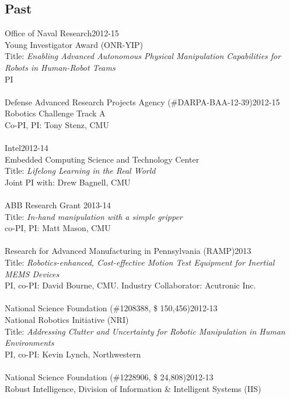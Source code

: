 \subsection{Past}
\noindent
Office of Naval Research\hfill 2012-15\\
Young Investigator Award (ONR-YIP)\\
Title: \textit{Enabling Advanced Autonomous Physical Manipulation Capabilities for Robots in Human-Robot Teams}\\
PI\\
\\
Defense Advanced Research Projects Agency (\#DARPA-BAA-12-39)\hfill 2012-15\\
Robotics Challenge Track A\\
Co-PI, PI: Tony Stenz, CMU\\
\\
Intel\hfill 2012-14\\
Embedded Computing Science and Technology Center\\
Title: \textit{Lifelong Learning in the Real World}\\
Joint PI with: Drew Bagnell, CMU\\
\\
ABB Research Grant \hfill 2013-14\\
Title: \textit{In-hand manipulation with a simple gripper}\\
co-PI, PI: Matt Mason, CMU\\
\\
Research for Advanced Manufacturing in Pennsylvania (RAMP)\hfill 2013\\
Title: \textit{Robotics-enhanced, Cost-effective Motion Test Equipment for Inertial MEMS Devices}\\
PI, co-PI: David Bourne, CMU. Industry Collaborator: Acutronic Inc.\\
\\
National Science Foundation (\#1208388, \$ 150,456)\hfill 2012-13\\
National Robotics Initiative (NRI)\\
Title: \textit{Addressing Clutter and Uncertainty for Robotic Manipulation in Human Environments}\\
PI, co-PI: Kevin Lynch, Northwestern\\
\\
National Science Foundation (\#1228906, \$ 24,808)\hfill 2012-13\\
Robust Intelligence, Division of Information \& Intelligent Systems (IIS)\\
